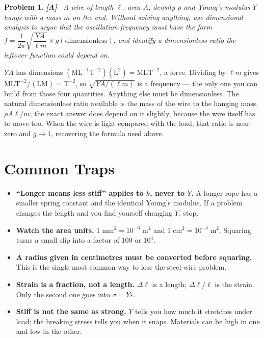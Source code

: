 \documentclass[11pt]{article}
\newcommand{\clearpts}{\addtocounter{tpts}{\value{cpts}} \setcounter{cpts}{0}}
\newcommand{\pts}[1]{\clearpts \setcounter{cpts}{#1}}
\newcommand{\advanced}{\!\textbf{\color{advblue}[A]\color{black}}\ }
\theoremstyle{mystyle}
\newtheorem{pproblem}{Problem}
\begin{document}
\pts{4}
\begin{pproblem} \advanced
A wire of length $\ell$, area $A$, density $\rho$ and Young's modulus $Y$ hangs with a
mass $m$ on the end. Without solving anything, use dimensional analysis to argue that the
oscillation frequency must have the form
$f = \dfrac{1}{2\pi}\sqrt{\dfrac{YA}{\ell m}} \times g(\text{dimensionless})$, and
identify a dimensionless ratio the leftover function could depend on.
\end{pproblem}
\begin{solution}
$YA$ has dimensions $(\mathrm{M}\mathrm{L}^{-1}\mathrm{T}^{-2})(\mathrm{L}^2) = \mathrm{M}\mathrm{L}\mathrm{T}^{-2}$, a force. Dividing by $\ell m$ gives
$\mathrm{M}\mathrm{L}\mathrm{T}^{-2}/(\mathrm{L}\mathrm{M}) = \mathrm{T}^{-2}$, so $\sqrt{YA/(\ell m)}$ is a frequency --- the only one you can
build from those four quantities. Anything else must be dimensionless. The natural
dimensionless ratio available is the mass of the wire to the hanging mass,
$\rho A \ell / m$; the exact answer does depend on it slightly, because the wire itself
has to move too. When the wire is light compared with the load, that ratio is near zero
and $g \to 1$, recovering the formula used above.
\end{solution}

\section{Common Traps}

\begin{psremark*}{}{}
\begin{itemize}
\item[$\bullet$] \textbf{``Longer means less stiff'' applies to $k$, never to $Y$.} A
longer rope has a smaller spring constant and the identical Young's modulus. If a problem
changes the length and you find yourself changing $Y$, stop.
\item[$\bullet$] \textbf{Watch the area units.} $1\;\mathrm{mm}^2 = 10^{-6}\;\mathrm{m}^2$
and $1\;\mathrm{cm}^2 = 10^{-4}\;\mathrm{m}^2$. Squaring turns a small slip into a factor
of $100$ or $10^4$.
\item[$\bullet$] \textbf{A radius given in centimetres must be converted before squaring.}
This is the single most common way to lose the steel-wire problem.
\item[$\bullet$] \textbf{Strain is a fraction, not a length.} $\Delta \ell$ is a length;
$\Delta \ell / \ell$ is the strain. Only the second one goes into $\sigma = Y\varepsilon$.
\item[$\bullet$] \textbf{Stiff is not the same as strong.} $Y$ tells you how much it
stretches under load; the breaking stress tells you when it snaps. Materials can be high
in one and low in the other.
\end{itemize}
\end{psremark*}
\end{document}
